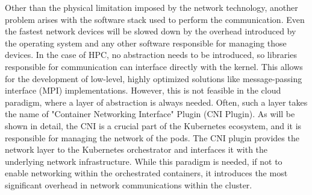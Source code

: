 

Other than the physical limitation imposed by the network technology, another
problem arises with the software stack used to perform the communication. Even
the fastest network devices will be slowed down by the overhead introduced by
the operating system and any other software responsible for managing those
devices.  In the case of HPC, no abstraction needs to be introduced, so
libraries responsible for communication can interface directly with the kernel.
This allows for the development of low-level, highly optimized solutions like
message-passing interface (MPI) implementations. However, this is not feasible
in the cloud paradigm, where a layer of abstraction is always needed. Often,
such a layer takes the name of "Container Networking Interface" Plugin (CNI
Plugin). As will be shown in detail, the CNI is a crucial part of the Kubernetes
ecosystem, and it is responsible for managing the network of the pods. The CNI
plugin provides the network layer to the Kubernetes orchestrator and interfaces
it with the underlying network infrastructure. While this paradigm is needed, if
not to enable networking within the orchestrated containers, it introduces the
most significant overhead in network communications within the cluster.

